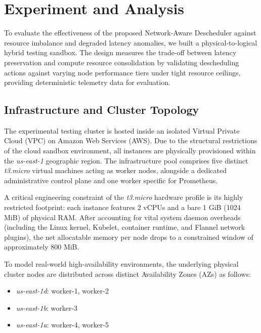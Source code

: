 \section{Experiment and Analysis}
\label{bab:4}


To evaluate the effectiveness of the proposed Network-Aware Descheduler against resource imbalance and degraded latency anomalies, we built a physical-to-logical hybrid testing sandbox. The design measures the trade-off between latency preservation and compute resource consolidation by validating descheduling actions against varying node performance tiers under tight resource ceilings, providing deterministic telemetry data for evaluation.


\subsection{Infrastructure and Cluster Topology}
\label{subsubsec:netaware4_infrasetup}

The experimental testing cluster is hosted inside an isolated Virtual Private Cloud (VPC) on Amazon Web Services (AWS). Due to the structural restrictions of the cloud sandbox environment, all instances are physically provisioned within the \textit{us-east-1} geographic region. The infrastructure pool comprises five distinct \textit{t3.micro} virtual machines acting as worker nodes, alongside a dedicated administrative control plane and one worker specific for Prometheus.

A critical engineering constraint of the \textit{t3.micro} hardware profile is its highly restricted footprint: each instance features 2 vCPUs and a bare 1 GiB (1024 MiB) of physical RAM. After accounting for vital system daemon overheads (including the Linux kernel, Kubelet, container runtime, and Flannel network plugins), the net allocatable memory per node drops to a constrained window of approximately 800 MiB.

To model real-world high-availability environments, the underlying physical cluster nodes are distributed across distinct Availability Zones (AZs) as follows:

\begin{itemize}
    \item \textit{us-east-1d}: worker-1, worker-2
    \item \textit{us-east-1b}: worker-3
    \item \textit{us-east-1a}: worker-4, worker-5
\end{itemize}


